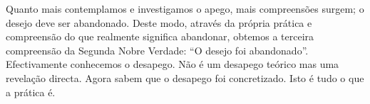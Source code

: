 Quanto mais contemplamos e investigamos o apego, mais compreensões surgem; o
desejo deve ser abandonado. Deste modo, através da própria prática e compreensão
do que realmente significa abandonar, obtemos a terceira compreensão da Segunda
Nobre Verdade: “O desejo foi abandonado”. Efectivamente conhecemos o desapego.
Não é um desapego teórico mas uma revelação directa. Agora sabem que o desapego
foi concretizado. Isto é tudo o que a prática é.

